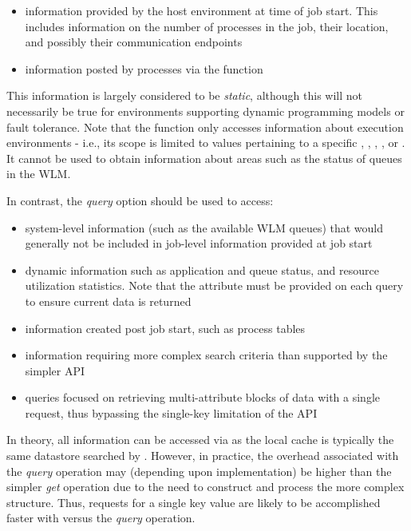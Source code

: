 \begin{itemize}
\item information provided by the host environment at time of job start. This includes information on the number of processes in the job, their location, and possibly their communication endpoints
\item information posted by processes via the  function
\end{itemize}

This information is largely considered to be \emph{static}, although this will not necessarily be true for environments supporting dynamic programming models or fault tolerance. Note that the  function only accesses information about execution environments - i.e., its scope is limited to values pertaining to a specific , , , , or . It cannot be used to obtain information about areas such as the status of queues in the \ac{WLM}.

In contrast, the \emph{query} option should be used to access:

\begin{itemize}
\item system-level information (such as the available \ac{WLM} queues) that would generally not be included in job-level information provided at job start
\item dynamic information such as application and queue status, and resource utilization statistics. Note that the  attribute must be provided on each query to ensure current data is returned
\item information created post job start, such as process tables
\item information requiring more complex search criteria than supported by the simpler  \ac{API}
\item queries focused on retrieving multi-attribute blocks of data with a single request, thus bypassing the single-key limitation of the  \ac{API}
\end{itemize}

In theory, all information can be accessed via  as the local cache is typically the same datastore searched by . However, in practice, the overhead associated with the \emph{query} operation may (depending upon implementation) be higher than the simpler \emph{get} operation due to the need to construct and process the more complex  structure. Thus, requests for a single key value are likely to be accomplished faster with  versus the \emph{query} operation.


